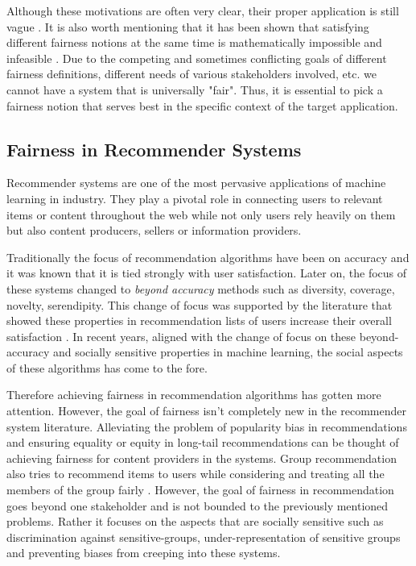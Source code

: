 Although these motivations are often very clear, their proper application is still vague \cite{xiang2019legal}. It is also worth mentioning that it has been shown that satisfying different fairness notions at the same time is mathematically impossible and infeasible \cite{Kleinberg:InherentTrade,chouldechova2017fair}. Due to the competing and sometimes conflicting goals of different fairness definitions, different needs of various stakeholders involved, etc. we cannot have a system that is universally "fair". Thus, it is essential to pick a fairness notion that serves best in the specific context of the target application. 

\subsection{Fairness in Recommender Systems}
Recommender systems are one of the most pervasive applications of machine learning in industry. They play a pivotal role in connecting users to relevant items or content throughout the web while not only users rely heavily on them but also content producers, sellers or information providers.

Traditionally the focus of recommendation algorithms have been on accuracy and it was known that it is tied strongly with user satisfaction. Later on, the focus of these systems changed to \emph{beyond accuracy} methods such as diversity, coverage, novelty, serendipity. This change of focus was supported by the literature that showed these properties in recommendation lists of users increase their overall satisfaction . In recent years, aligned with the change of focus on these beyond-accuracy and socially sensitive properties in machine learning, the social aspects of these algorithms has come to the fore.

Therefore achieving fairness in recommendation algorithms has gotten more attention. However, the goal of fairness isn't completely new in the recommender system literature. Alleviating the problem of popularity bias in recommendations \cite{popbias2018} and ensuring equality or equity in long-tail recommendations \cite{ferraro2019} can be thought of achieving fairness for content providers in the systems. Group recommendation also tries to recommend items to users while considering and treating all the members of the group fairly \cite{kaya2020}. However, the goal of fairness in recommendation goes beyond one stakeholder and is not bounded to the previously mentioned problems. Rather it focuses on the aspects that are socially sensitive such as discrimination against sensitive-groups, under-representation of sensitive groups and preventing biases from creeping into these systems.

